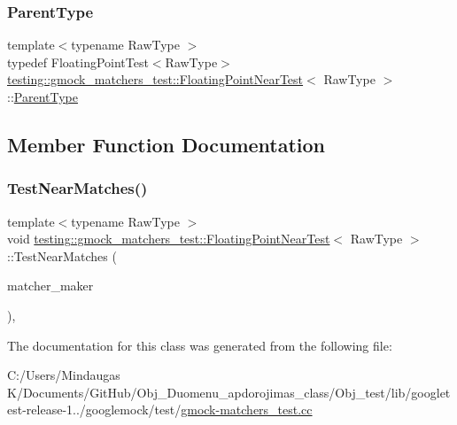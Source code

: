 \subsubsection{\texorpdfstring{ParentType}{ParentType}}
{\footnotesize\ttfamily template$<$typename Raw\+Type $>$ \\
typedef Floating\+Point\+Test$<$Raw\+Type$>$ \mbox{\hyperlink{classtesting_1_1gmock__matchers__test_1_1_floating_point_near_test}{testing\+::gmock\+\_\+matchers\+\_\+test\+::\+Floating\+Point\+Near\+Test}}$<$ Raw\+Type $>$\+::\mbox{\hyperlink{classtesting_1_1gmock__matchers__test_1_1_floating_point_near_test_ac767d2bf3e518d1e7cf9dfafc76cc53a}{Parent\+Type}}\hspace{0.3cm}{\ttfamily [protected]}}



\subsection{Member Function Documentation}
\mbox{\label{classtesting_1_1gmock__matchers__test_1_1_floating_point_near_test_a712b564197ab76f58d345c5e3e73955d}} 
\subsubsection{\texorpdfstring{TestNearMatches()}{TestNearMatches()}}
{\footnotesize\ttfamily template$<$typename Raw\+Type $>$ \\
void \mbox{\hyperlink{classtesting_1_1gmock__matchers__test_1_1_floating_point_near_test}{testing\+::gmock\+\_\+matchers\+\_\+test\+::\+Floating\+Point\+Near\+Test}}$<$ Raw\+Type $>$\+::Test\+Near\+Matches (\begin{DoxyParamCaption}\item[{testing\+::internal\+::\+Floating\+Eq\+Matcher$<$ Raw\+Type $>$($\ast$)(Raw\+Type, Raw\+Type)}]{matcher\+\_\+maker }\end{DoxyParamCaption})\hspace{0.3cm}{\ttfamily [inline]}, {\ttfamily [protected]}}



The documentation for this class was generated from the following file\+:\begin{DoxyCompactItemize}
\item 
C\+:/\+Users/\+Mindaugas K/\+Documents/\+Git\+Hub/\+Obj\+\_\+\+Duomenu\+\_\+apdorojimas\+\_\+class/\+Obj\+\_\+test/lib/googletest-\/release-\/1../googlemock/test/\mbox{\hyperlink{_obj__test_2lib_2googletest-release-1_88_81_2googlemock_2test_2gmock-matchers__test_8cc}{gmock-\/matchers\+\_\+test.\+cc}}\end{DoxyCompactItemize}
